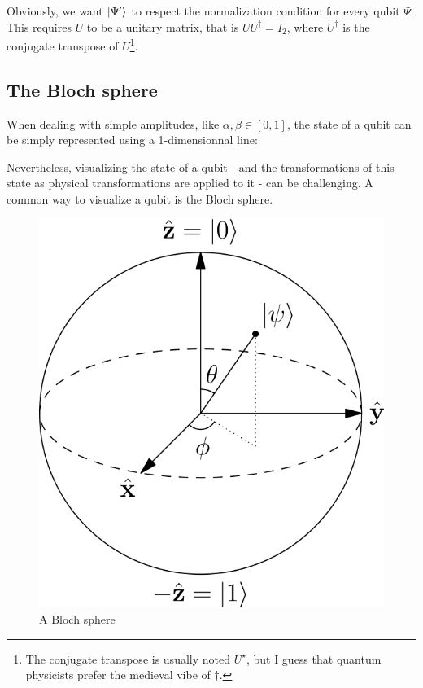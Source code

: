 \documentclass[12pt,a4paper]{article}
\theoremstyle{plain}
\theoremstyle{definition}
\DeclarePairedDelimiter\ket{\lvert}{\rangle}
\begin{document}
Obviously, we want $\ket{\Psi'}$ to respect the normalization condition for every qubit $\Psi$. This requires $U$ to be a unitary matrix, that is $UU^\dagger = I_2$, where $U^\dagger$ is the conjugate transpose of $U$\footnote{The conjugate transpose is usually noted $U^\star$, but I guess that quantum physicists prefer the medieval vibe of $\dagger$.}.

\subsection{The Bloch sphere}
When dealing with simple amplitudes, like $\alpha, \beta\in [0, 1]$, the state of a qubit can be simply represented using a 1-dimensionnal line:

Nevertheless, visualizing the state of a qubit - and the transformations of this state as physical transformations are applied to it - can be challenging. A common way to visualize a qubit is the Bloch sphere.

\begin{figure}
    \centering
    \includegraphics*{bloch-sphere}
    \caption{A Bloch sphere}
\end{figure}
\end{document}
